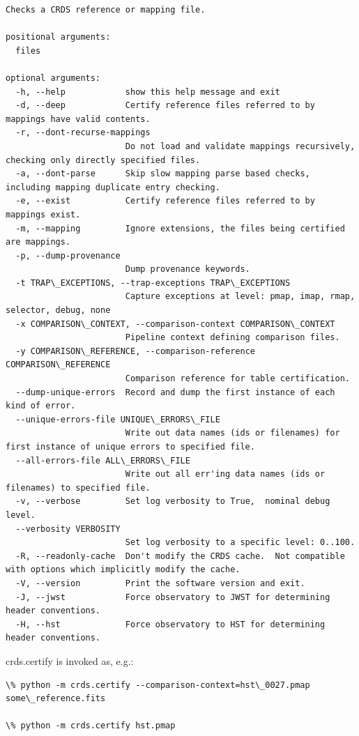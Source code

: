 \documentclass[letterpaper,10pt,english]{sphinxmanual}
\begin{document}
\begin{Verbatim}[commandchars=\\\{\}]
Checks a CRDS reference or mapping file.

positional arguments:
  files

optional arguments:
  -h, --help            show this help message and exit
  -d, --deep            Certify reference files referred to by mappings have valid contents.
  -r, --dont-recurse-mappings
                        Do not load and validate mappings recursively,  checking only directly specified files.
  -a, --dont-parse      Skip slow mapping parse based checks,  including mapping duplicate entry checking.
  -e, --exist           Certify reference files referred to by mappings exist.
  -m, --mapping         Ignore extensions, the files being certified are mappings.
  -p, --dump-provenance
                        Dump provenance keywords.
  -t TRAP\_EXCEPTIONS, --trap-exceptions TRAP\_EXCEPTIONS
                        Capture exceptions at level: pmap, imap, rmap, selector, debug, none
  -x COMPARISON\_CONTEXT, --comparison-context COMPARISON\_CONTEXT
                        Pipeline context defining comparison files.
  -y COMPARISON\_REFERENCE, --comparison-reference COMPARISON\_REFERENCE
                        Comparison reference for table certification.
  --dump-unique-errors  Record and dump the first instance of each kind of error.
  --unique-errors-file UNIQUE\_ERRORS\_FILE
                        Write out data names (ids or filenames) for first instance of unique errors to specified file.
  --all-errors-file ALL\_ERRORS\_FILE
                        Write out all err'ing data names (ids or filenames) to specified file.
  -v, --verbose         Set log verbosity to True,  nominal debug level.
  --verbosity VERBOSITY
                        Set log verbosity to a specific level: 0..100.
  -R, --readonly-cache  Don't modify the CRDS cache.  Not compatible with options which implicitly modify the cache.
  -V, --version         Print the software version and exit.
  -J, --jwst            Force observatory to JWST for determining header conventions.
  -H, --hst             Force observatory to HST for determining header conventions.
\end{Verbatim}

crds.certify is invoked as, e.g.:

\begin{Verbatim}[commandchars=\\\{\}]
\% python -m crds.certify --comparison-context=hst\_0027.pmap   some\_reference.fits

\% python -m crds.certify hst.pmap
\end{Verbatim}
\end{document}
